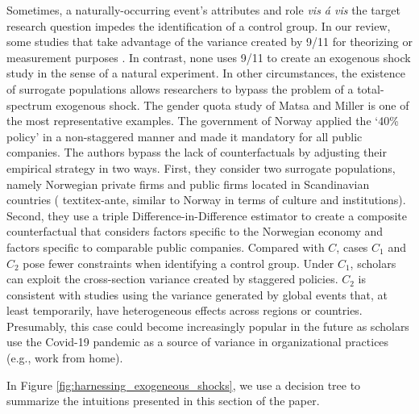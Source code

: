 \documentclass[11pt]{article}
\begin{document}
\begin{refsection}
Sometimes, a naturally-occurring event's attributes and role
\textit{vis \'a vis} the target research question impedes the identification of
a control group. In our review, some studies that take advantage of the variance
created by 9/11 for theorizing \autocite{corbo2016323} or measurement purposes
\autocite{vergne20121027}.  In contrast, none uses 9/11 to create an exogenous
shock study in the sense of a natural experiment. In other circumstances, the
existence of surrogate populations allows researchers to bypass the problem of a
total-spectrum exogenous shock. The gender quota study of Matsa and Miller 
\autocite*{matsa_miller_2013} is one of the most representative examples.  The
government of Norway applied the `40\% policy' in a non-staggered manner and
made it mandatory for all public companies. The authors bypass the lack of
counterfactuals by adjusting their empirical strategy in two ways. First, they
consider two surrogate populations, namely Norwegian private firms and public
firms located in Scandinavian countries ( textit{ex-ante}, similar to Norway in
terms of culture and institutions).  Second, they use a triple
Difference-in-Difference estimator to create a composite counterfactual that
considers factors specific to the Norwegian economy and factors specific to
comparable public companies. Compared with $C$, cases $C_{1}$ and $C_{2}$ pose
fewer constraints when identifying a control group. Under $C_{1}$, scholars can
exploit the cross-section  variance created by staggered policies. $C_{2}$ is
consistent with studies using the variance generated by global events that, at
least temporarily, have heterogeneous effects across regions or countries.
Presumably, this case could become increasingly popular in the future as
scholars use the Covid-19 pandemic as a source of variance in organizational
practices (e.g., work from home).

In Figure \ref{fig:harnessing_exogeneous_shocks}, we use a decision tree to 
summarize the intuitions presented in this section of the paper. 


\end{refsection}
\end{document}
